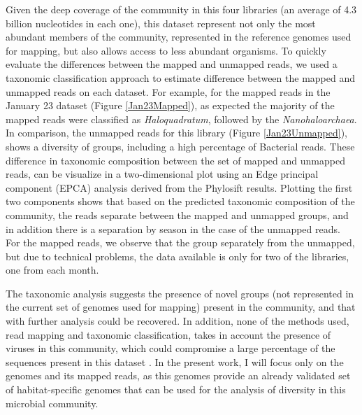 Given the deep coverage of the community in this four libraries (an average of 4.3 billion nucleotides in each one), this dataset represent not only the most abundant members of the community, represented in the reference genomes used for mapping, but also allows access to less abundant organisms. To quickly evaluate the differences between the mapped and unmapped reads, we used a taxonomic classification approach to estimate difference between the mapped and unmapped reads on each dataset. For example, for the mapped reads in the January 23 dataset (Figure \ref{Jan23Mapped}), as expected the majority of the mapped reads were classified as \textit{Haloquadratum}, followed by the \textit{Nanohaloarchaea}. In comparison, the unmapped reads for this library (Figure \ref{Jan23Unmapped}), shows a diversity of groups, including a high percentage of Bacterial reads. These difference in taxonomic composition between the set of mapped and unmapped reads, can be visualize in a two-dimensional plot using an Edge principal component (EPCA) analysis \cite{Matsen:2011wn} derived from the Phylosift results. Plotting the first two components shows that based on the predicted taxonomic composition of the community, the reads separate between the mapped and unmapped groups, and in addition there is a separation by season in the case of the unmapped reads. For the mapped reads, we observe that the group separately from the unmapped, but due to technical problems, the data available is only for two of the libraries, one from each month. 

The taxonomic analysis suggests the presence of novel groups (not represented in the current set of genomes used for mapping) present in the community, and that with further analysis could be recovered. In addition, none of the methods used, read mapping and taxonomic classification, takes in account the presence of viruses in this community, which could compromise a large percentage of the sequences present in this dataset \cite{RodriguezBrito:2010in,Emerson:tk}. In the present work, I will focus only on the genomes and its mapped reads, as this genomes provide an already validated set of habitat-specific genomes that can be used for the analysis of diversity in this microbial community.

